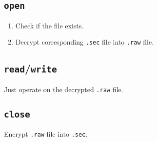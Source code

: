 \documentclass{article}
\begin{document}
\subsection{\texttt{open}}

\begin{enumerate}
    \item Check if the file exists.
    \item Decrypt corresponding \texttt{.sec} file into \texttt{.raw} file.
\end{enumerate}

\subsection{\texttt{read}/\texttt{write}}

Just operate on the decrypted \texttt{.raw} file.

\subsection{\texttt{close}}

Encrypt \texttt{.raw} file into \texttt{.sec}.
\end{document}
